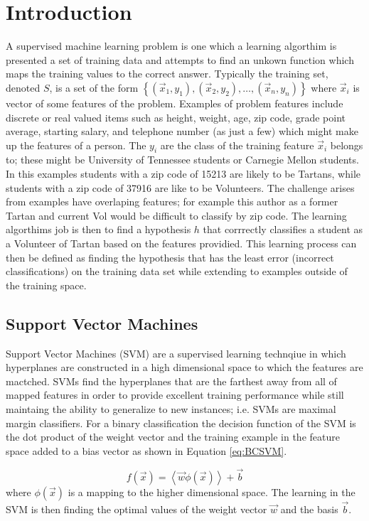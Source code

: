 \section{Introduction}

A supervised machine learning problem is one which a learning algorthim is presented a set of training data and attempts to find an unkown function which maps the training values to the correct answer.
Typically the training set, denoted $S$, is a set of the form $\left \{ (\vec{x}_1,y_1), (\vec{x}_2,y_2), \dots, (\vec{x}_n,y_n) \right \}$ where $\vec{x}_i$ is vector of some features of the problem.
Examples of problem features include discrete or real valued items such as height, weight, age, zip code, grade point average, starting salary, and telephone number (as just a few)  which might make up the features of a person.
The $y_i$ are the class of the training feature $\vec{x}_i$ belongs to; these might be University of Tennessee students or Carnegie Mellon students.
In this examples students with a zip code of 15213 are likely to be Tartans, while students with a zip code of 37916 are like to be Volunteers.
The challenge arises from examples have overlaping features; for example this author as a former Tartan and current Vol would be difficult to classify by zip code.
The learning algorthims job is then to find a hypothesis $h$ that corrrectly classifies a student as a Volunteer of Tartan based on the features providied.
This learning process can then be defined as finding the hypothesis that has the least error (incorrect classifications) on the training data set while extending to examples outside of the training space.

\subsection{Support Vector Machines}
Support Vector Machines (SVM) are a supervised learning technqiue in which hyperplanes are constructed in a high dimensional space to which the features are mactched.
SVMs find the hyperplanes that are the farthest away from all of mapped features in order to provide excellent training performance while still maintaing the ability to generalize to new instances; i.e. SVMs are maximal margin classifiers.
For a binary classification the decision function of the SVM is the dot product of the weight vector and the training example in the feature space added to a bias vector as shown in Equation \ref{eq:BCSVM}.

\begin{equation}
\label{eq:BCSVM}
f \left ( \vec{x} \right ) = \left \langle \vec{w} \phi(\vec{x}) \right \rangle + \vec{b}
\end{equation}
where $\phi(\vec{x})$ is a mapping to the higher dimensional space.
The learning in the SVM is then finding the optimal values of the weight vector $\vec{w}$ and the basis $\vec{b}$.


